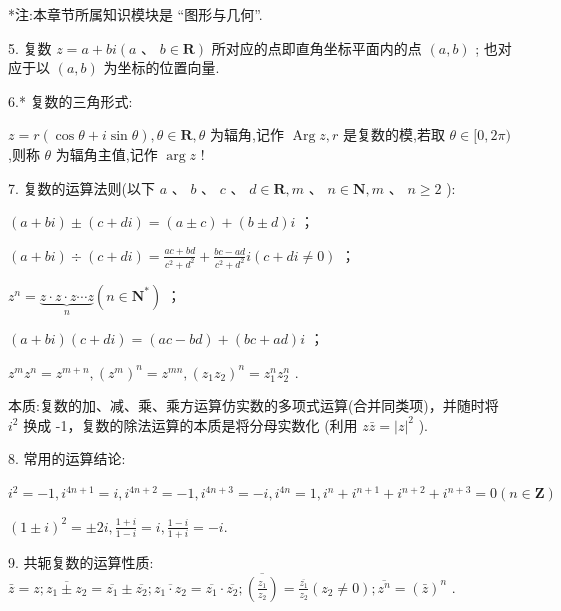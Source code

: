 *注:本章节所属知识模块是 “图形与几何”.

\HRule

5. 复数 $z = a + b{i}\left( {a\text{ 、 }b \in  \mathbf{R}}\right)$ 所对应的点即直角坐标平面内的点 $\left( {a,b}\right)$ ; 也对应于以 $\left( {a,b}\right)$ 为坐标的位置向量.

6.* 复数的三角形式:

$z = r\left( {\cos \theta  + {i}\sin \theta }\right) ,\theta  \in  \mathbf{R},\theta$ 为辐角,记作 $\operatorname{Arg}z,r$ 是复数的模,若取 $\theta  \in  \lbrack 0,{2\pi })$ ,则称 $\theta$ 为辐角主值,记作 $\arg z$ !

7. 复数的运算法则(以下 $a$ 、 $b$ 、 $c$ 、 $d \in  \mathbf{R},m$ 、 $n \in  \mathbf{N},m$ 、 $n \geq  2$ ):

   $\left( {a + b{i}}\right)  \pm  \left( {c + d{i}}\right)  = \left( {a \pm  c}\right)  + \left( {b \pm  d}\right) {i}$ ；

   $\left( {a + b{i}}\right)  \div  \left( {c + d{i}}\right)  = \frac{{ac} + {bd}}{{c}^{2} + {d}^{2}} + \frac{{bc} - {ad}}{{c}^{2} + {d}^{2}}{i}\left( {c + d{i} \neq  0}\right)$ ；

   ${z}^{n} = \underset{n}{\underbrace{z \cdot  z \cdot  z\cdots z}}\left( {n \in  {\mathbf{N}}^{ * }}\right)$ ；

   $\left( {a + b{i}}\right) \left( {c + d{i}}\right)  = \left( {{ac} - {bd}}\right)  + \left( {{bc} + {ad}}\right) {i}$ ；

   ${z}^{m}{z}^{n} = {z}^{m + n},{\left( {z}^{m}\right) }^{n} = {z}^{mn},{\left( {z}_{1}{z}_{2}\right) }^{n} = {z}_{1}^{n}{z}_{2}^{n}$ .

本质:复数的加、减、乘、乘方运算仿实数的多项式运算(合并同类项)，并随时将 ${{i}}^{2}$ 换成 -1，复数的除法运算的本质是将分母实数化 (利用 $z\bar{z} = {\left| z\right| }^{2}$ ).

8. 常用的运算结论:

${{i}}^{2} =  - 1,{{i}}^{{4n} + 1} = {i},{{i}}^{{4n} + 2} =  - 1,{{i}}^{{4n} + 3} =  - {i},{{i}}^{4n} = 1,{{i}}^{n} + {{i}}^{n + 1} + {{i}}^{n + 2} + {{i}}^{n + 3} = 0\left( {n \in  \mathbf{Z}}\right)$

${\left( 1 \pm  {i}\right) }^{2} =  \pm  2{i},\frac{1 + {i}}{1 - {i}} = {i},\frac{1 - {i}}{1 + {i}} =  - {i}.$

9. 共轭复数的运算性质: $\bar{z} = z;\overline{{z}_{1} \pm  {z}_{2}} = \overline{{z}_{1}} \pm  \overline{{z}_{2}};\overline{{z}_{1} \cdot  {z}_{2}} = \overline{{z}_{1}} \cdot  \overline{{z}_{2}};\overline{\left( \frac{{z}_{1}}{{z}_{2}}\right) } = \frac{\overline{{z}_{1}}}{{z}_{2}}\left( {{z}_{2} \neq  0}\right) ;\overline{{z}^{n}} = {\left( \bar{z}\right) }^{n}$ .

